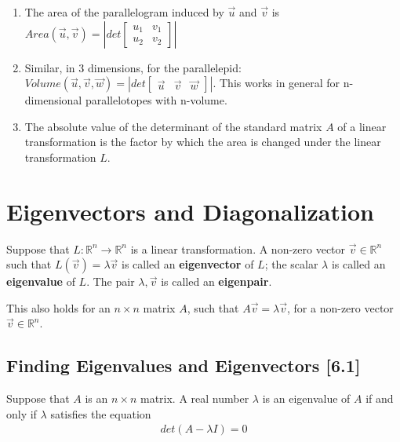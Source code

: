 \documentclass[a4paper,9pt]{extarticle}
\begin{document}
\begin{multicols*}{2}
\begin{enumerate}[label=\bfseries (\arabic*)] \itemsep0pt \parskip0pt 
    \item The area of the parallelogram induced by $\vec{u}$ and $\vec{v}$ is $Area(\vec{u}, \vec{v}) = |det \begin{bmatrix}u_1 & v_1 \\ u_2 & v_2 \end{bmatrix}|$
    \item Similar, in 3 dimensions, for the parallelepid: $Volume(\vec{u}, \vec{v}, \vec{w}) = |det \begin{bmatrix}\vec{u} & \vec{v} & \vec{w}\end{bmatrix}|$. This works in general for n-dimensional parallelotopes with n-volume.
    \item The absolute value of the determinant of the standard matrix $A$ of a linear transformation is the factor by which the area is changed under the linear transformation $L$.
\end{enumerate}




\section{Eigenvectors and Diagonalization}

Suppose that $L : \mathbb{R}^n \to \mathbb{R}^n$ is a linear transformation. A non-zero vector $\vec{v} \in \mathbb{R}^n$ such that $L(\vec{v}) = \lambda \vec{v}$ is called an \textbf{eigenvector} of $L$; the scalar $\lambda$ is called an \textbf{eigenvalue} of $L$. The pair $\lambda, \vec{v}$ is called an \textbf{eigenpair}.

This also holds for an $n \times n$ matrix $A$, such that $A \vec{v} = \lambda \vec{v}$, for a non-zero vector $\vec{v} \in \mathbb{R}^n$.


\subsection{Finding Eigenvalues and Eigenvectors [6.1]}
Suppose that $A$ is an $n \times n$ matrix. A real number $\lambda$ is an eigenvalue of $A$ if and only if $\lambda$ satisfies the equation
\begin{equation} \label{6.1-1}
    \begin{split}
        det(A - \lambda I) = 0
    \end{split}
\end{equation}


\end{multicols*}
\end{document}
